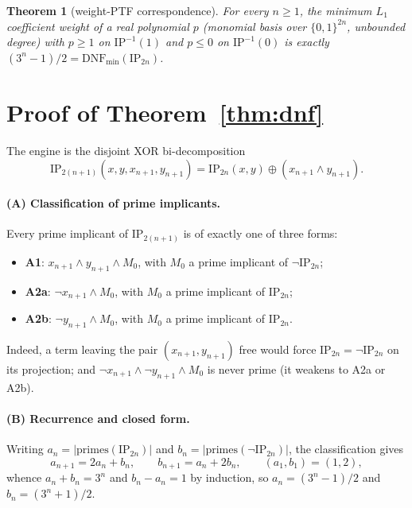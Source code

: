 \documentclass[11pt]{article}
\newtheorem{theorem}{Theorem}
\newcommand{\IP}{\mathrm{IP}}
\newcommand{\DNFmin}{\mathrm{DNF}_{\min}}
\newcommand{\primes}{\mathrm{primes}}
\begin{document}
\begin{theorem}[weight-PTF correspondence]\label{thm:ptf}
For every $n \ge 1$, the minimum $L_1$ coefficient weight of a real
polynomial $p$ (monomial basis over $\{0,1\}^{2n}$, unbounded degree)
with $p \ge 1$ on $\IP^{-1}(1)$ and $p \le 0$ on $\IP^{-1}(0)$ is
exactly $(3^n-1)/2 = \DNFmin(\IP_{2n})$.
\end{theorem}

\section{Proof of Theorem~\ref{thm:dnf}}

The engine is the disjoint XOR bi-decomposition
\begin{equation}\label{eq:bidec}
\IP_{2(n+1)}(x, y, x_{n+1}, y_{n+1})
  = \IP_{2n}(x, y) \oplus (x_{n+1} \wedge y_{n+1}).
\end{equation}

\paragraph{(A) Classification of prime implicants.}
Every prime implicant of $\IP_{2(n+1)}$ is of exactly one of three
forms:
\begin{itemize}
\item \textbf{A1}: $x_{n+1} \wedge y_{n+1} \wedge M_0$, with $M_0$ a
  prime implicant of $\lnot\IP_{2n}$;
\item \textbf{A2a}: $\lnot x_{n+1} \wedge M_0$, with $M_0$ a prime
  implicant of $\IP_{2n}$;
\item \textbf{A2b}: $\lnot y_{n+1} \wedge M_0$, with $M_0$ a prime
  implicant of $\IP_{2n}$.
\end{itemize}
Indeed, a term leaving the pair $(x_{n+1}, y_{n+1})$ free would force
$\IP_{2n} = \lnot\IP_{2n}$ on its projection; and
$\lnot x_{n+1} \wedge \lnot y_{n+1} \wedge M_0$ is never prime (it
weakens to A2a or A2b).

\paragraph{(B) Recurrence and closed form.}
Writing $a_n = \lvert\primes(\IP_{2n})\rvert$ and
$b_n = \lvert\primes(\lnot\IP_{2n})\rvert$, the classification gives
\[
a_{n+1} = 2a_n + b_n, \qquad b_{n+1} = a_n + 2b_n,
\qquad (a_1, b_1) = (1, 2),
\]
whence $a_n + b_n = 3^n$ and $b_n - a_n = 1$ by induction, so
$a_n = (3^n-1)/2$ and $b_n = (3^n+1)/2$.
\end{document}

